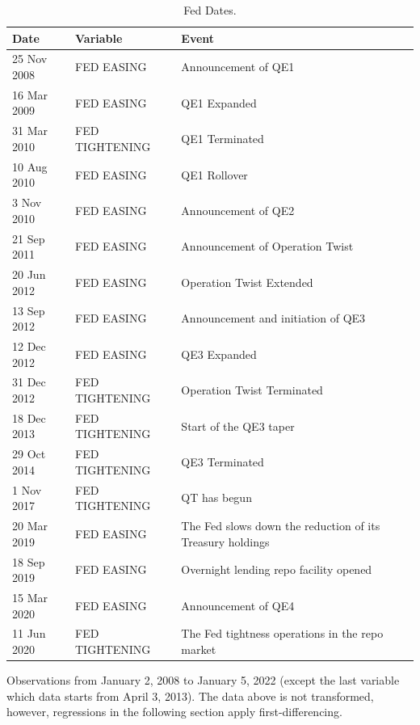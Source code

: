 \documentclass[11pt,a4paper,english,oneside]{article}
\begin{document}
\begin{appendices}

\begin{table}[!h] \centering
\begin{threeparttable}
\caption{Fed Dates.}
\begin{tabular}{lll}
\toprule
Date & Variable & Event \\
\midrule
25 Nov 2008 & FED EASING & Announcement of QE1 \\
16 Mar 2009 & FED EASING & QE1 Expanded \\
31 Mar 2010 & FED TIGHTENING & QE1 Terminated \\
10 Aug 2010 & FED EASING & QE1 Rollover \\
3 Nov 2010 & FED EASING & Announcement of QE2 \\
21 Sep 2011 & FED EASING & Announcement of Operation Twist \\
20 Jun 2012 & FED EASING & Operation Twist Extended \\
13 Sep 2012 & FED EASING & Announcement and initiation of QE3 \\
12 Dec 2012 & FED EASING & QE3 Expanded \\
31 Dec 2012 & FED TIGHTENING & Operation Twist Terminated \\
18 Dec 2013 & FED TIGHTENING & Start of the QE3 taper \\
29 Oct 2014 & FED TIGHTENING & QE3 Terminated \\
1 Nov 2017 & FED TIGHTENING & QT has begun \\
20 Mar 2019 & FED EASING & The Fed slows down the reduction of its Treasury holdings \\
18 Sep 2019 & FED EASING & Overnight lending repo facility opened \\
15 Mar 2020 & FED EASING & Announcement of QE4 \\
11 Jun 2020 & FED TIGHTENING & The Fed tightness operations in the repo market \\
\bottomrule
\end{tabular}
Observations from January 2, 2008 to January 5, 2022 (except the last variable which data starts from April 3, 2013). The data above is not transformed, however, regressions in the following section apply first-differencing.
\label{table:fed}
\end{threeparttable}
\end{table}


\end{appendices}
\end{document}
